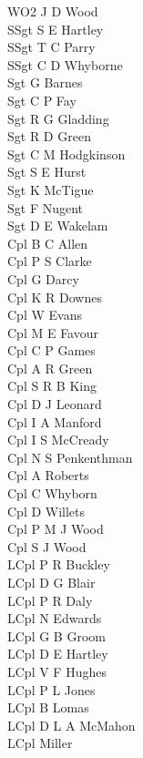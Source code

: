 \begin{multicols}{3}
  \small
  \noindent
  WO2 J D Wood \\
  SSgt S E Hartley \\
  SSgt T C Parry \\
  SSgt C D Whyborne \\
  Sgt G Barnes \\
  Sgt C P Fay \\
  Sgt R G Gladding \\
  Sgt R D Green \\
  Sgt C M Hodgkinson \\
  Sgt S E Hurst \\
  Sgt K McTigue \\
  Sgt F Nugent \\
  Sgt D E Wakelam \\
  Cpl B C Allen \\
  Cpl P S Clarke \\
  Cpl G Darcy \\
  Cpl K R Downes \\
  Cpl W Evans \\
  Cpl M E Favour \\
  Cpl C P Games \\
  Cpl A R Green \\
  Cpl S R B King \\
  Cpl D J Leonard \\
  Cpl I A Manford \\
  Cpl I S McCready \\
  Cpl N S Penkenthman \\
  Cpl A Roberts \\
  Cpl C Whyborn \\
  Cpl D Willets \\
  Cpl P M J Wood \\
  Cpl S J Wood \\
  LCpl P R Buckley \\
  LCpl D G Blair \\
  LCpl P R Daly \\
  LCpl N Edwards \\
  LCpl G B Groom \\
  LCpl D E Hartley \\
  LCpl V F Hughes \\
  LCpl P L Jones \\
  LCpl B Lomas \\
  LCpl D L A McMahon \\
  LCpl Miller \\

\end{multicols}
